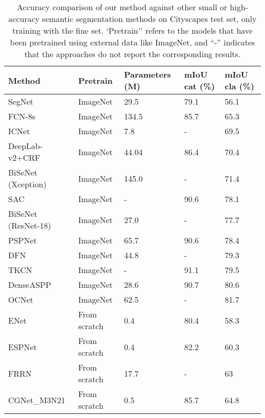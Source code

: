 \documentclass[10pt,twocolumn,letterpaper]{article}
\begin{document}
\begin{table*}[t]
\begin{center}

\begin{tabular}{|p{4cm}p{2cm}<{\centering}p{2.5cm}<{\centering}p{2.3cm}<{\centering}p{2.5cm}<{\centering}|}
\hline
Method & Pretrain & Parameters (M)   &mIoU cat (\%) &mIoU cla (\%) \\
\hline\hline
SegNet \cite{badrinarayanan2017segnet}       &ImageNet   & 29.5    & 79.1    & 56.1 \\
FCN-8s \cite{shelhamer2017fully}             &ImageNet   & 134.5   & 85.7    & 65.3\\
ICNet \cite{zhaoicnet}                       &ImageNet   & 7.8     &   -  & 69.5 \\


DeepLab-v2+CRF \cite{chen2016deeplab}        &ImageNet  &44.04    & 86.4     & 70.4\\

BiSeNet (Xception) \cite{yu2018bisenet}  &ImageNet  & 145.0   &   -   & 71.4 \\
SAC \cite{zhang2017scale}                  &ImageNet        & -    &90.6          &78.1 \\
BiSeNet (ResNet-18) \cite{yu2018bisenet} &ImageNet  & 27.0     &  -    & 77.7 \\
PSPNet \cite{Zhao_2017_CVPR}            &ImageNet  & 65.7     & 90.6 & 78.4\\
DFN \cite{Yu_2018_CVPR}                  &ImageNet  & 44.8     &  -    &79.3\\
TKCN \cite{wu2018tree}                &ImageNet     &  -        &91.1      &  79.5\\
DenseASPP \cite{yang2018denseaspp}     & ImageNet   &28.6      &  90.7   &80.6\\
OCNet \cite{yuan2018ocnet}              & ImageNet  & 62.5         &-        &81.7 \\
\hline
ENet \cite{paszke2016enet}                 &From scratch &0.4     & 80.4     &58.3 \\
ESPNet \cite{mehta2018espnet}              &From scratch &0.4     & 82.2     &60.3 \\
FRRN \cite{pohlen2017fullresolution}      & From scratch & 17.7   &   -   & 63 \\

\hline
CGNet\_M3N21                         & From scratch & 0.5  & 85.7     &64.8\\
\hline
\end{tabular}
\end{center}
\caption{Accuracy comparison of our method against other small or high-accuracy semantic segmentation methods on Cityscapes test set, only training with the fine set. `Pretrain'' refers to the models that have been pretrained using external data like ImageNet, and ``-'' indicates that the approaches do not report the corresponding results.}
\label{table:tab10}
\vspace{-10pt}
\end{table*}
\end{document}
